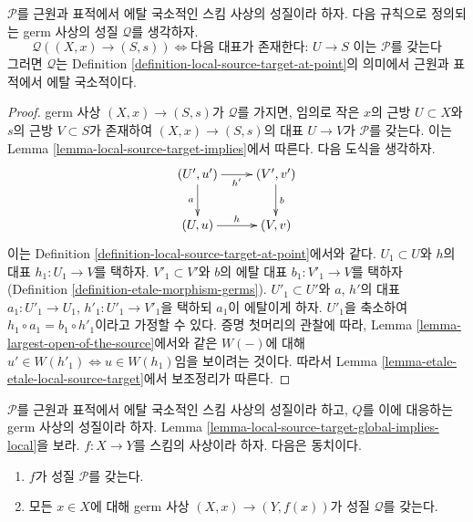 \begin{lemma}
\label{lemma-local-source-target-global-implies-local}
$\mathcal{P}$를 근원과 표적에서 에탈 국소적인 스킴 사상의 성질이라
하자. 다음 규칙으로 정의되는 germ 사상의 성질 $\mathcal{Q}$를
생각하자.
$$
\mathcal{Q}((X, x) \to (S, s))
\Leftrightarrow
\text{다음 대표가 존재한다: }U \to S
\text{ 이는 }\mathcal{P}\text{를 갖는다}
$$
그러면 $\mathcal{Q}$는 Definition
\ref{definition-local-source-target-at-point}의 의미에서 근원과
표적에서 에탈 국소적이다.
\end{lemma}

\begin{proof}
germ 사상 $(X, x) \to (S, s)$가 $\mathcal{Q}$를 가지면, 임의로 작은
$x$의 근방 $U \subset X$와 $s$의 근방 $V \subset S$가 존재하여
$(X, x) \to (S, s)$의 대표 $U \to V$가 $\mathcal{P}$를 갖는다.
이는 Lemma \ref{lemma-local-source-target-implies}에서 따른다. 다음
도식을 생각하자.
$$
\xymatrix{
(U', u') \ar[r]_{h'} \ar[d]_a & (V', v') \ar[d]^b \\
(U, u) \ar[r]^h & (V, v)
}
$$
이는 Definition \ref{definition-local-source-target-at-point}에서와 같다.
$U_1 \subset U$와 $h$의 대표 $h_1 : U_1 \to V$를 택하자.
$V'_1 \subset V'$와 $b$의 에탈 대표 $b_1 : V'_1 \to V$를 택하자
(Definition \ref{definition-etale-morphism-germs}). $U'_1 \subset U'$와
$a$, $h'$의 대표 $a_1 : U'_1 \to U_1$, $h'_1 : U'_1 \to V'_1$을
택하되 $a_1$이 에탈이게 하자. $U'_1$을 축소하여
$h_1 \circ a_1 = b_1 \circ h'_1$이라고 가정할 수 있다. 증명 첫머리의
관찰에 따라, Lemma \ref{lemma-largest-open-of-the-source}에서와 같은
$W(-)$에 대해 $u' \in W(h'_1) \Leftrightarrow u \in W(h_1)$임을
보이려는 것이다. 따라서 Lemma
\ref{lemma-etale-etale-local-source-target}에서 보조정리가 따른다.
\end{proof}

\begin{lemma}
\label{lemma-local-source-target-local-implies-global}
$\mathcal{P}$를 근원과 표적에서 에탈 국소적인 스킴 사상의 성질이라
하고, $Q$를 이에 대응하는 germ 사상의 성질이라 하자. Lemma
\ref{lemma-local-source-target-global-implies-local}을 보라.
$f : X \to Y$를 스킴의 사상이라 하자. 다음은 동치이다.
\begin{enumerate}
\item $f$가 성질 $\mathcal{P}$를 갖는다.
\item 모든 $x \in X$에 대해 germ 사상 $(X, x) \to (Y, f(x))$가
성질 $\mathcal{Q}$를 갖는다.
\end{enumerate}
\end{lemma}

